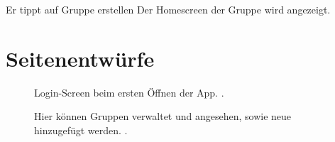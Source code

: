 \documentclass[parskip=full,11pt]{scrartcl}
\begin{document}
{Er tippt auf Gruppe erstellen}
{Der Homescreen der Gruppe wird angezeigt.} %

\pagebreak
\appendix

\section{Seitenentwürfe}


\begin{figure}[hb]
	\caption{\label{fig:menu}
		Login-Screen beim ersten Öffnen der App.
		 .
	}
\end{figure}

\begin{figure}[hb]
	\caption{\label{fig:groups}
		Hier können Gruppen verwaltet und angesehen, sowie neue hinzugefügt werden.
		.
	}
\end{figure}
\end{document}
